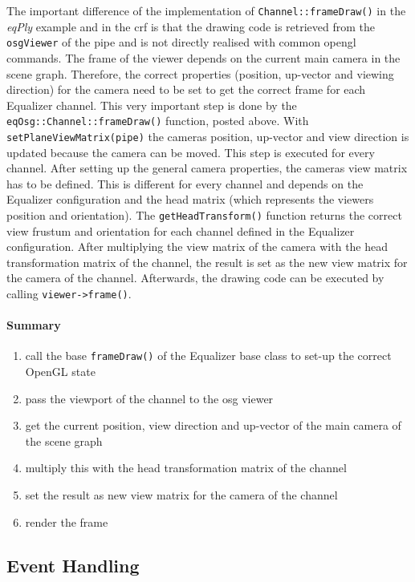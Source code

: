 The important difference of the implementation of \texttt{Channel::frameDraw()} in the \emph{eqPly} example and in the \gls{crf} is that the drawing code is retrieved from the \texttt{osgViewer} of the pipe and is not directly realised with common \gls{opengl} commands. The frame of the viewer depends on the current main camera in the scene graph. Therefore, the correct properties (position, up-vector and viewing direction) for the camera need to be set to get the correct frame for each Equalizer channel. This very important step is done by the \texttt{eqOsg::Channel::frameDraw()} function, posted above. With \texttt{setPlaneViewMatrix(pipe)} the cameras position, up-vector and view direction is updated because the camera can be moved. This step is executed for every channel. 
After setting up the general camera properties, the cameras view matrix has to be defined. This is different for every channel and depends on the Equalizer configuration and the head matrix (which represents the viewers position and orientation). The \texttt{getHeadTransform()} function returns the correct view frustum and orientation for each channel defined in the Equalizer configuration. 
After multiplying the view matrix of the camera with the head transformation matrix of the channel, the result is set as the new view matrix for the camera of the channel.
Afterwards, the drawing code can be executed by calling \texttt{viewer->frame()}.

\paragraph{Summary}
\label{sec:Recap}
\begin{enumerate}
	\item call the base \texttt{frameDraw()} of the Equalizer base class to set-up the correct OpenGL state
	\item pass the viewport of the channel  to the \gls{osg} viewer
	\item get the current position, view direction and up-vector of the main camera of the scene graph
	\item multiply this with the head transformation matrix of the channel
	\item set the result as new view matrix for the camera of the channel
	\item render the frame
\end{enumerate}

\subsection{Event Handling}
